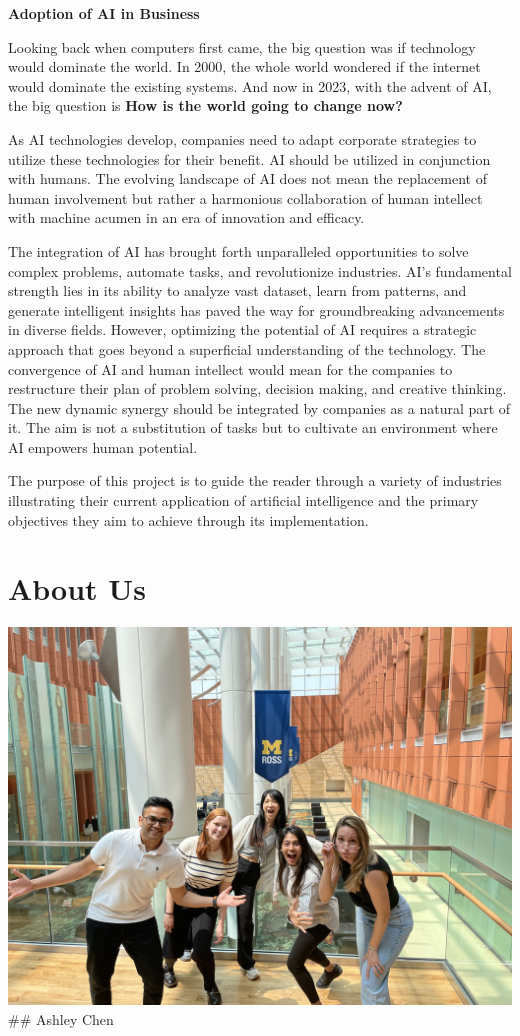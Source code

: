 \documentclass[
]{article}
\begin{document}
\textbf{Adoption of AI in Business}

Looking back when computers first came, the big question was if technology would dominate the world. In 2000, the whole world wondered if the internet would dominate the existing systems. And now in 2023, with the advent of AI, the big question is \textbf{How is the world going to change now?}

As AI technologies develop, companies need to adapt corporate strategies to utilize these technologies for their benefit. AI should be utilized in conjunction with humans. The evolving landscape of AI does not mean the replacement of human involvement but rather a harmonious collaboration of human intellect with machine acumen in an era of innovation and efficacy.

The integration of AI has brought forth unparalleled opportunities to solve complex problems, automate tasks, and revolutionize industries. AI's fundamental strength lies in its ability to analyze vast dataset, learn from patterns, and generate intelligent insights has paved the way for groundbreaking advancements in diverse fields. However, optimizing the potential of AI requires a strategic approach that goes beyond a superficial understanding of the technology.
The convergence of AI and human intellect would mean for the companies to restructure their plan of problem solving, decision making, and creative thinking. The new dynamic synergy should be integrated by companies as a natural part of it. The aim is not a substitution of tasks but to cultivate an environment where AI empowers human potential.

The purpose of this project is to guide the reader through a variety of industries illustrating their current application of artificial intelligence and the primary objectives they aim to achieve through its implementation.

\hypertarget{about-us}{%
\section{About Us}\label{about-us}}

\includegraphics{group_photo.jpg}
\#\# Ashley Chen
\end{document}
